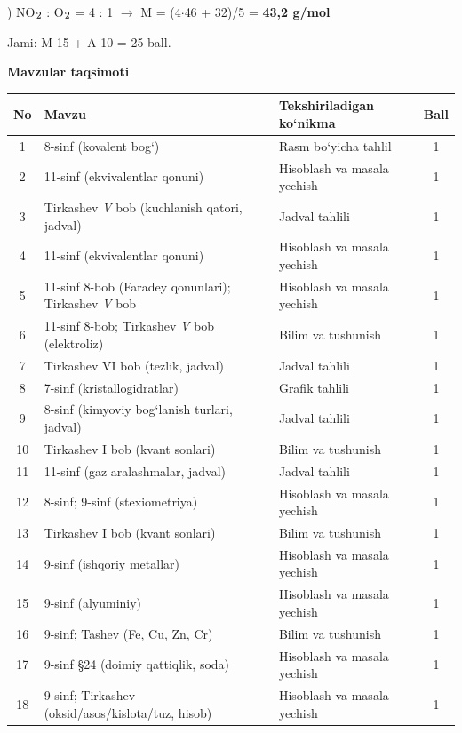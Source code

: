 \documentclass[11pt,a4paper]{article}
\renewcommand{\textsubscript}[1]{\ensuremath{_{\text{\fontsize{8}{8}\selectfont #1}}}}
\begin{document}
) NO\textsubscript{2} : O\textsubscript{2} = 4 : 1 $\to$ M = (4$\cdot$46 + 32)/5 = \textbf{43,2 g/mol}\par
\noindent Jami: M 15 + A 10 = 25 ball.\par
\par\bigskip\noindent\textbf{Mavzular taqsimoti}\par\smallskip
{\small\noindent\begin{longtable}{|c|p{7.2cm}|p{5.4cm}|c|}\hline \textbf{No} & \textbf{Mavzu} & \textbf{Tekshiriladigan ko`nikma} & \textbf{Ball}\\\hline
1 & 8-sinf (kovalent bog`) & Rasm bo`yicha tahlil & 1\\\hline
2 & 11-sinf (ekvivalentlar qonuni) & Hisoblash va masala yechish & 1\\\hline
3 & Tirkashev \textit{V} bob (kuchlanish qatori, jadval) & Jadval tahlili & 1\\\hline
4 & 11-sinf (ekvivalentlar qonuni) & Hisoblash va masala yechish & 1\\\hline
5 & 11-sinf 8-bob (Faradey qonunlari); Tirkashev \textit{V} bob & Hisoblash va masala yechish & 1\\\hline
6 & 11-sinf 8-bob; Tirkashev \textit{V} bob (elektroliz) & Bilim va tushunish & 1\\\hline
7 & Tirkashev VI bob (tezlik, jadval) & Jadval tahlili & 1\\\hline
8 & 7-sinf (kristallogidratlar) & Grafik tahlili & 1\\\hline
9 & 8-sinf (kimyoviy bog`lanish turlari, jadval) & Jadval tahlili & 1\\\hline
10 & Tirkashev I bob (kvant sonlari) & Bilim va tushunish & 1\\\hline
11 & 11-sinf (gaz aralashmalar, jadval) & Jadval tahlili & 1\\\hline
12 & 8-sinf; 9-sinf (stexiometriya) & Hisoblash va masala yechish & 1\\\hline
13 & Tirkashev I bob (kvant sonlari) & Bilim va tushunish & 1\\\hline
14 & 9-sinf (ishqoriy metallar) & Hisoblash va masala yechish & 1\\\hline
15 & 9-sinf (alyuminiy) & Hisoblash va masala yechish & 1\\\hline
16 & 9-sinf; Tashev (Fe, Cu, Zn, Cr) & Bilim va tushunish & 1\\\hline
17 & 9-sinf \S{}24 (doimiy qattiqlik, soda) & Hisoblash va masala yechish & 1\\\hline
18 & 9-sinf; Tirkashev (oksid/asos/kislota/tuz, hisob) & Hisoblash va masala yechish & 1\\\hline

\end{longtable}}
\end{document}
